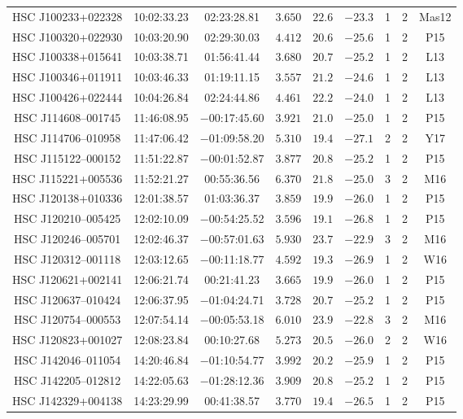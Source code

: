 \documentclass[]{pasj01}
\begin{document}
{\begin{longtable}{ccccccccc}
HSC J100233+022328 & 10:02:33.23 & 02:23:28.81 & $3.650$ & $22.6$ & $-23.3$ & 1 & 2 & Mas12 \\
HSC J100320+022930 & 10:03:20.90 & 02:29:30.03 & $4.412$ & $20.6$ & $-25.6$ & 1 & 2 & P15 \\
HSC J100338+015641 & 10:03:38.71 & 01:56:41.44 & $3.680$ & $20.7$ & $-25.2$ & 1 & 2 & L13 \\
HSC J100346+011911 & 10:03:46.33 & 01:19:11.15 & $3.557$ & $21.2$ & $-24.6$ & 1 & 2 & L13 \\
HSC J100426+022444 & 10:04:26.84 & 02:24:44.86 & $4.461$ & $22.2$ & $-24.0$ & 1 & 2 & L13 \\
HSC J114608--001745 & 11:46:08.95 & $-$00:17:45.60 & $3.921$ & $21.0$ & $-25.0$ & 1 & 2 & P15 \\
HSC J114706--010958 & 11:47:06.42 & $-$01:09:58.20 & $5.310$ & $19.4$ & $-27.1$ & 2 & 2 & Y17 \\
HSC J115122--000152 & 11:51:22.87 & $-$00:01:52.87 & $3.877$ & $20.8$ & $-25.2$ & 1 & 2 & P15 \\
HSC J115221+005536 & 11:52:21.27 & 00:55:36.56 & $6.370$ & $21.8$ & $-25.0$ & 3 & 2 & M16 \\
HSC J120138+010336 & 12:01:38.57 & 01:03:36.37 & $3.859$ & $19.9$ & $-26.0$ & 1 & 2 & P15 \\
HSC J120210--005425 & 12:02:10.09 & $-$00:54:25.52 & $3.596$ & $19.1$ & $-26.8$ & 1 & 2 & P15 \\
HSC J120246--005701 & 12:02:46.37 & $-$00:57:01.63 & $5.930$ & $23.7$ & $-22.9$ & 3 & 2 & M16 \\
HSC J120312--001118 & 12:03:12.65 & $-$00:11:18.77 & $4.592$ & $19.3$ & $-26.9$ & 1 & 2 & W16 \\
HSC J120621+002141 & 12:06:21.74 & 00:21:41.23 & $3.665$ & $19.9$ & $-26.0$ & 1 & 2 & P15 \\
HSC J120637--010424 & 12:06:37.95 & $-$01:04:24.71 & $3.728$ & $20.7$ & $-25.2$ & 1 & 2 & P15 \\
HSC J120754--000553 & 12:07:54.14 & $-$00:05:53.18 & $6.010$ & $23.9$ & $-22.8$ & 3 & 2 & M16 \\
HSC J120823+001027 & 12:08:23.84 & 00:10:27.68 & $5.273$ & $20.5$ & $-26.0$ & 2 & 2 & W16 \\
HSC J142046--011054 & 14:20:46.84 & $-$01:10:54.77 & $3.992$ & $20.2$ & $-25.9$ & 1 & 2 & P15 \\
HSC J142205--012812 & 14:22:05.63 & $-$01:28:12.36 & $3.909$ & $20.8$ & $-25.2$ & 1 & 2 & P15 \\
HSC J142329+004138 & 14:23:29.99 & 00:41:38.57 & $3.770$ & $19.4$ & $-26.5$ & 1 & 2 & P15 \\

\end{longtable}}
\end{document}
